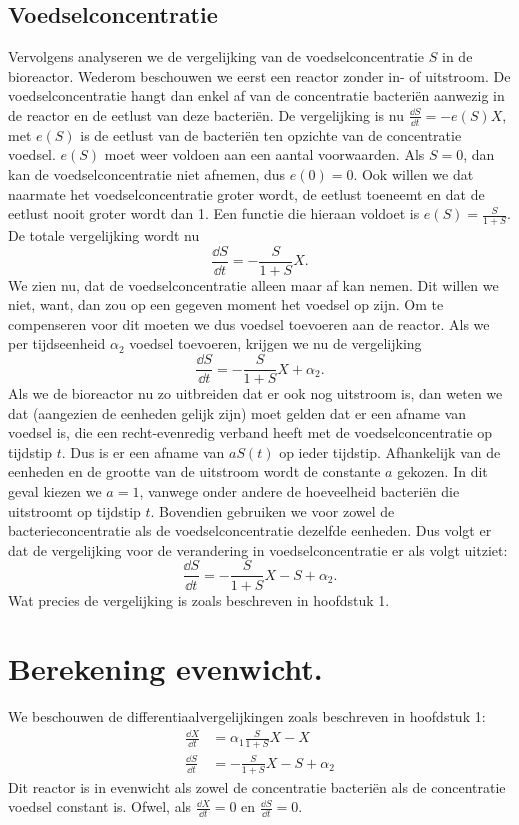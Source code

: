 \subsection*{Voedselconcentratie}
Vervolgens analyseren we de vergelijking van de voedselconcentratie $S$ in de bioreactor. Wederom beschouwen we eerst een reactor zonder in- of uitstroom. De voedselconcentratie hangt dan enkel af van de concentratie bacteri\"en aanwezig in de reactor en de eetlust van deze bacteri\"en. De vergelijking is nu $\tfrac{\dd S}{\dd t} = -e(S)X$, met $e(S)$ is de eetlust van de bacteri\"en ten opzichte van de concentratie voedsel. $e(S)$ moet weer voldoen aan een aantal voorwaarden. Als $S = 0$, dan kan de voedselconcentratie niet afnemen, dus $e(0)=0$. Ook willen we dat naarmate het voedselconcentratie groter wordt, de eetlust toeneemt en dat de eetlust nooit groter wordt dan 1. Een functie die hieraan voldoet is $e(S) = \frac{S}{1+S}$. De totale vergelijking wordt nu
\[\frac{\dd S}{\dd t}=-\frac{S}{1+S}X.\]
We zien nu, dat de voedselconcentratie alleen maar af kan nemen. Dit willen we niet, want, dan zou op een gegeven moment het voedsel op zijn. Om te compenseren voor dit moeten we dus voedsel toevoeren aan de reactor. Als we per tijdseenheid $\alpha_2$ voedsel toevoeren, krijgen we nu de vergelijking
\[\frac{\dd S}{\dd t}=-\frac{S}{1+S}X+\alpha_2.\]
Als we de bioreactor nu zo uitbreiden dat er ook nog uitstroom is, dan weten we dat (aangezien de eenheden gelijk zijn) moet gelden dat er een afname van voedsel is, die een recht-evenredig verband heeft met de voedselconcentratie op tijdstip $t$. Dus is er een afname van $a S(t)$ op ieder tijdstip. Afhankelijk van de eenheden en de grootte van de uitstroom wordt de constante $a$ gekozen. In dit geval kiezen we $a = 1$, vanwege onder andere de hoeveelheid bacteri\"en die uitstroomt op tijdstip $t$. Bovendien gebruiken we voor zowel de bacterieconcentratie als de voedselconcentratie dezelfde eenheden. Dus volgt er dat de vergelijking voor de verandering in voedselconcentratie er als volgt uitziet:
\begin{equation}
	\frac{\dd S}{\dd t} = -\frac{S}{1 + S} X - S + \alpha_2.
\end{equation}
Wat precies de vergelijking is zoals beschreven in hoofdstuk 1.

\section{Berekening evenwicht.}
We beschouwen de differentiaalvergelijkingen zoals beschreven in hoofdstuk 1:  
\begin{align}
	\frac{\dd X}{\dd t} &= \alpha_1 \frac{S}{1 + S} X - X 			\label{eq:be1}	\\
	\frac{\dd S}{\dd t} &= - \frac{S}{1 + S}X - S + \alpha_2 		\label{eq:be2}
\end{align}
Dit reactor is in evenwicht als zowel de concentratie bacteri\"en als de concentratie voedsel constant is. Ofwel, als $\frac{\dd X}{\dd t} = 0$ en $\frac{\dd S}{\dd t} = 0$.

